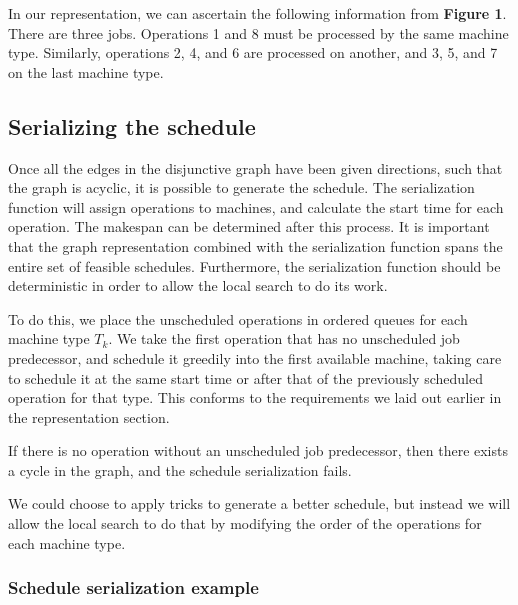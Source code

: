 \documentclass[a4paper,12pt]{article}
\begin{document}
In our representation, we can ascertain the following information from \textbf{Figure 1}. There are three jobs. Operations 1 and 8 must be processed by the same machine type. Similarly, operations 2, 4, and 6 are processed on another, and 3, 5, and 7 on the last machine type.

\subsection{Serializing the schedule}

Once all the edges in the disjunctive graph have been given directions, such that the graph is acyclic, it is possible to generate the schedule. The serialization function will assign operations to machines, and calculate the start time for each operation. The makespan can be determined after this process. It is important that the graph representation combined with the serialization function spans the entire set of feasible schedules. Furthermore, the serialization function should be deterministic in order to allow the local search to do its work.

To do this, we place the unscheduled operations in ordered queues for each machine type $T_k$. We take the first operation that has no unscheduled job predecessor, and schedule it greedily into the first available machine, taking care to schedule it at the same start time or after that of the previously scheduled operation for that type. This conforms to the requirements we laid out earlier in the representation section.

If there is no operation without an unscheduled job predecessor, then there exists a cycle in the graph, and the schedule serialization fails.

We could choose to apply tricks to generate a better schedule, but instead we will allow the local search to do that by modifying the order of the operations for each machine type.

\subsubsection{Schedule serialization example}
\end{document}
